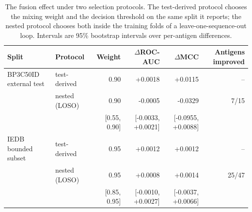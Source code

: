 \begin{table}[t]
\centering
\caption{The fusion effect under two selection protocols. The test-derived protocol chooses the mixing weight and the decision threshold on the same split it reports; the nested protocol chooses both inside the training folds of a leave-one-sequence-out loop. Intervals are 95\% bootstrap intervals over per-antigen differences.}
\label{tab:fusion}
\small
\setlength{\tabcolsep}{4pt}
\begin{tabular}{@{}llrrrr@{}}
\toprule
Split & Protocol & Weight & $\Delta$ROC-AUC & $\Delta$MCC & Antigens improved \\
\midrule
BP3C50ID external test & test-derived & 0.90 & +0.0018 & +0.0115 & -- \\
 & nested (LOSO) & 0.90 & -0.0005 & -0.0329 & 7/15 \\
 & & \tiny[0.55, 0.90] & \tiny[-0.0033, +0.0021] & \tiny[-0.0955, +0.0088] & \\
\addlinespace
IEDB bounded subset & test-derived & 0.95 & +0.0012 & +0.0012 & -- \\
 & nested (LOSO) & 0.95 & +0.0008 & +0.0014 & 25/47 \\
 & & \tiny[0.85, 0.95] & \tiny[-0.0010, +0.0027] & \tiny[-0.0037, +0.0066] & \\
\bottomrule
\end{tabular}
\end{table}
